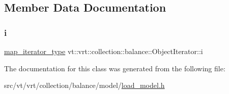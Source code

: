 \subsection{Member Data Documentation}
\mbox{\label{classvt_1_1vrt_1_1collection_1_1balance_1_1_object_iterator_a9c8bdb9fdb75846e2e99fe0148c06b6b}} 
\subsubsection{\texorpdfstring{i}{i}}
{\footnotesize\ttfamily \hyperlink{classvt_1_1vrt_1_1collection_1_1balance_1_1_object_iterator_a9100746b4842b68f94f569a9e8e2cda0}{map\+\_\+iterator\+\_\+type} vt\+::vrt\+::collection\+::balance\+::\+Object\+Iterator\+::i\hspace{0.3cm}{\ttfamily [private]}}



The documentation for this class was generated from the following file\+:\begin{DoxyCompactItemize}
\item 
src/vt/vrt/collection/balance/model/\hyperlink{load__model_8h}{load\+\_\+model.\+h}\end{DoxyCompactItemize}
